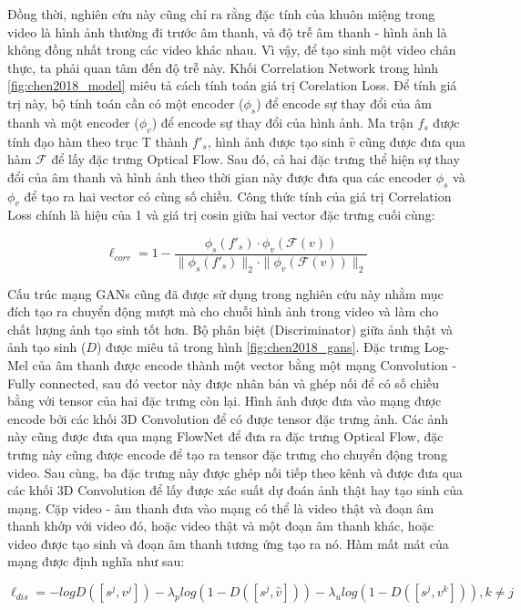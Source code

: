 Đồng thời, nghiên cứu này cũng chỉ ra rằng đặc tính của khuôn miệng trong video là hình ảnh thường đi trước âm thanh, và độ trễ âm thanh - hình ảnh là không đồng nhất trong các video khác nhau. Vì vậy, để tạo sinh một video chân thực, ta phải quan tâm đến độ trễ này. Khối Correlation Network trong hình \ref{fig:chen2018_model} miêu tả cách tính toán giá trị Corelation Loss. Để tính giá trị này, bộ tính toán cần có một encoder ($\phi_s$) để encode sự thay đổi của âm thanh và một encoder ($\phi_v$) để encode sự thay đổi của hình ảnh. Ma trận $f_s$ được tính đạo hàm theo trục T thành $f'_s$, hình ảnh được tạo sinh $\hat{v}$ cũng được đưa qua hàm $\mathcal{F}$ để lấy đặc trưng Optical Flow. Sau đó, cả hai đặc trưng thể hiện sự thay đổi của âm thanh và hình ảnh theo thời gian này được đưa qua các encoder $\phi_s$ và $\phi_v$ để tạo ra hai vector có cùng số chiều. Công thức tính của giá trị Correlation Loss chính là hiệu của 1 và giá trị cosin giữa hai vector đặc trưng cuối cùng:

\begin{equation}
    \ell_{corr} = 1 - \frac{\phi_s(f'_s)\cdot\phi_v(\mathcal{F}(v))}{\|\phi_s(f'_s)\|_2\cdot\|\phi_v(\mathcal{F}(v))\|_2}
    \label{eqn:chen2018_corr_loss}
\end{equation}


Cấu trúc mạng GANs cũng đã được sử dụng trong nghiên cứu này nhằm mục đích tạo ra chuyển động mượt mà cho chuỗi hình ảnh trong video và làm cho chất lượng ảnh tạo sinh tốt hơn. Bộ phân biệt (Discriminator) giữa ảnh thật và ảnh tạo sinh ($D$) được miêu tả trong hình \ref{fig:chen2018_gans}. Đặc trưng Log-Mel của âm thanh được encode thành một vector bằng một mạng Convolution - Fully connected, sau đó vector này được nhân bản và ghép nối để có số chiều bằng với tensor của hai đặc trưng còn lại. Hình ảnh được đưa vào mạng được encode bởi các khối 3D Convolution để có được tensor đặc trưng ảnh. Các ảnh này cũng được đưa qua mạng FlowNet để đưa ra đặc trưng Optical Flow, đặc trưng này cũng được encode để tạo ra tensor đặc trưng cho chuyển động trong video. Sau cùng, ba đặc trưng này được ghép nối tiếp theo kênh và được đưa qua các khối 3D Convolution để lấy được xác suất dự đoán ảnh thật hay tạo sinh của mạng. Cặp video - âm thanh đưa vào mạng có thể là video thật và đoạn âm thanh khớp với video đó, hoặc video thật và một đoạn âm thanh khác, hoặc video được tạo sinh và đoạn âm thanh tương ứng tạo ra nó. Hàm mất mát của mạng được định nghĩa như sau:

\begin{equation}
    \ell_{dis} = -logD([s^j, v^j]) - \lambda_plog(1 - D([s^j, \hat{v}])) - \lambda_ulog(1 - D([s^j, v^k])), k \ne j
\end{equation}

